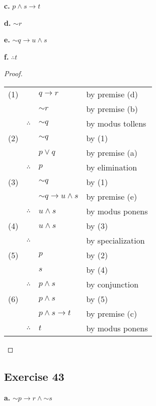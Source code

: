 \documentclass[14pt]{extarticle}
\begin{document}
{\bf c.} $p \wedge s \to t$

{\bf d.} ${\sim r}$

{\bf e.} ${\sim q} \to u \wedge s$

{\bf f.} $\therefore t$

\begin{proof} \begin{tabular}{rrll}
        (1) &              & $q \to r$                 & by premise (d)    \\
            &              & ${\sim r}$                & by premise (b)    \\
            & $\therefore$ & ${\sim q}$                & by modus tollens  \\
        (2) &              & ${\sim q}$                & by (1)            \\
            &              & $p \vee q$                & by premise (a)    \\
            & $\therefore$ & $p$                       & by elimination    \\
        (3) &              & ${\sim q}$                & by (1)            \\
            &              & ${\sim q} \to u \wedge s$ & by premise (e)    \\
            & $\therefore$ & $u \wedge s$              & by modus ponens   \\
        (4) &              & $u \wedge s$              & by (3)            \\
            & $\therefore$ & $ $                       & by specialization \\
        (5) &              & $p$                       & by (2)            \\ & & $s$ & by (4) \\
            & $\therefore$ & $p \wedge s$              & by conjunction    \\
        (6) &              & $p \wedge s$              & by (5)            \\
            &              & $p \wedge s \to t$        & by premise (c)    \\
            & $\therefore$ & $t$                       & by modus ponens   \\
    \end{tabular}
\end{proof}

\subsection{Exercise 43}
{\bf a.} ${\sim p} \to r \wedge {\sim s}$
\end{document}
